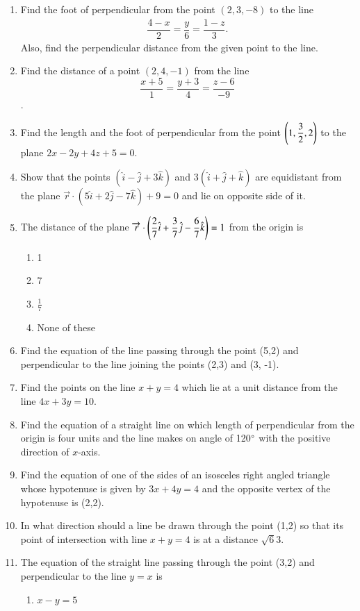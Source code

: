 \begin{enumerate}[label=\thesubsection.\arabic*,ref=\thesubsection.\theenumi]
\item Find the foot of perpendicular from the point $(2,3,-8)$ to the line  
\begin{align*}
	\dfrac{4-x}{2}=\dfrac{y}{6}=\dfrac{1-z}{3}.
\end{align*}
	Also, find the perpendicular distance from the given point to the line.
\item Find the distance of a point $(2,4,-1)$ from the line $$\frac{x+5}{1}=\frac{y+3}{4}=\frac{z-6}{-9}$$.
\item Find the length and the foot of perpendicular from the point $ \left(1,\dfrac{3}{2} ,2 \right)$ to the plane $2x-2y+4z+5=0.$
\item Show that the points $(\hat{i}-\hat{j}+3\hat{k})$ and $3(\hat{i}+\hat{j}+\hat{k})$ are equidistant from the plane $\overrightarrow{r} \cdot (5\hat{i}+2\hat{j}-7\hat{k})+9=0$ and lie on opposite side of it.
\item The distance of the plane $\overrightarrow{r} \cdot \left( \dfrac{2}{7}\hat{i}+\dfrac{3}{7}\hat{j}-\dfrac{6}{7}\hat{k}\right)=1$ from the origin is 
\begin{enumerate}
	\item 1
	\item 7
	\item $\frac{1}{7}$
	\item None of these	
\end{enumerate}
\item Find the equation of the line passing through the point (5,2) and perpendicular to the line joining the points (2,3) and (3, -1).
\item Find the points on the line $x+y=4$ which lie at a unit distance from the line $4x+3y=10$.
\item Find the equation of a straight line on which length of perpendicular from the origin is four units and the line makes on angle of 120$\degree$ with the positive direction of $x$-axis. 
\item Find the equation of one of the sides of an isosceles right angled triangle whose hypotenuse is given by $3x+4y=4$ and the opposite vertex of the hypotenuse is (2,2).
\item In what direction should a line be drawn through the point (1,2) so that its point of intersection with line $x+y=4$ is at a distance $\sqrt{6}{3}$. 
\item The equation of the straight line passing through the point (3,2) and perpendicular to the line $y=x$ is
\begin{enumerate}
\item $x-y=5$

\end{enumerate}
\end{enumerate}
